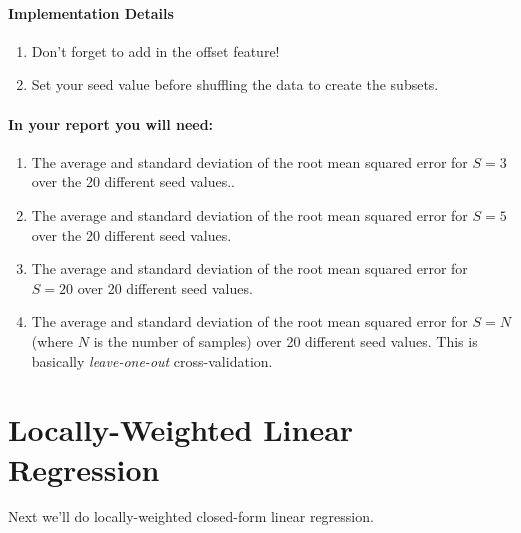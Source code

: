 \documentclass[12pt]{article}
\begin{document}
\paragraph{Implementation Details}
\begin{enumerate}
\item Don't forget to add in the offset feature!
\item Set your seed value before shuffling the data to create the subsets.
\end{enumerate}


\paragraph{In your report you will need:}
\begin{enumerate}
\item The average and standard deviation of the root mean squared error for $S=3$ over the 20 different seed values..
\item The average and standard deviation of the root mean squared error for $S=5$ over the 20 different seed values.
\item The average and standard deviation of the root mean squared error for $S=20$ over 20 different seed values.
\item The average and standard deviation of the root mean squared error for $S=N$ (where $N$ is the number of samples) over 20 different seed values.  This is basically \emph{leave-one-out} cross-validation.
\end{enumerate}


\newpage
\section{Locally-Weighted Linear Regression}
\noindent
Next we'll do locally-weighted closed-form linear regression.\\
\end{document}
